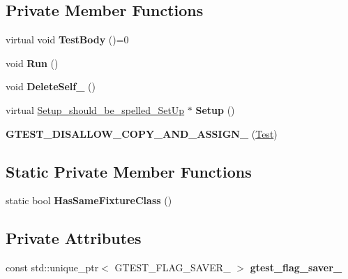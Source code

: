 \subsection*{Private Member Functions}
\begin{DoxyCompactItemize}
\item 
\mbox{\label{classtesting_1_1_test_a146a4a5d9854e676d625a0ef67409794}} 
virtual void {\bfseries Test\+Body} ()=0
\item 
\mbox{\label{classtesting_1_1_test_ab70d07cb03d17ccb1aedc2be66eaccff}} 
void {\bfseries Run} ()
\item 
\mbox{\label{classtesting_1_1_test_a3116f1f98ac889b11f1e3d981b8c6ca1}} 
void {\bfseries Delete\+Self\+\_\+} ()
\item 
\mbox{\label{classtesting_1_1_test_a65c1626d50b7dd1a1d759dc6c3f72d4c}} 
virtual \mbox{\hyperlink{structtesting_1_1_test_1_1_setup__should__be__spelled___set_up}{Setup\+\_\+should\+\_\+be\+\_\+spelled\+\_\+\+Set\+Up}} $\ast$ {\bfseries Setup} ()
\item 
\mbox{\label{classtesting_1_1_test_a5d18da7437b0d6ca32dcad90a21f9b6b}} 
{\bfseries G\+T\+E\+S\+T\+\_\+\+D\+I\+S\+A\+L\+L\+O\+W\+\_\+\+C\+O\+P\+Y\+\_\+\+A\+N\+D\+\_\+\+A\+S\+S\+I\+G\+N\+\_\+} (\mbox{\hyperlink{classtesting_1_1_test}{Test}})
\end{DoxyCompactItemize}
\subsection*{Static Private Member Functions}
\begin{DoxyCompactItemize}
\item 
\mbox{\label{classtesting_1_1_test_ab76536a462529a457429061e209a8ee7}} 
static bool {\bfseries Has\+Same\+Fixture\+Class} ()
\end{DoxyCompactItemize}
\subsection*{Private Attributes}
\begin{DoxyCompactItemize}
\item 
\mbox{\label{classtesting_1_1_test_a7801584e65ac93e641916baa14f03943}} 
const std\+::unique\+\_\+ptr$<$ G\+T\+E\+S\+T\+\_\+\+F\+L\+A\+G\+\_\+\+S\+A\+V\+E\+R\+\_\+ $>$ {\bfseries gtest\+\_\+flag\+\_\+saver\+\_\+}
\end{DoxyCompactItemize}
